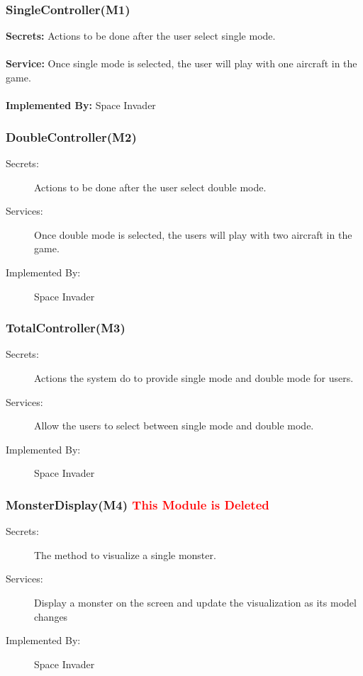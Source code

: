 \documentclass[12pt]{article}
\begin{document}
\subsubsection{SingleController(M1)}

\textbf{Secrets:} Actions to be done after the user select single mode.\\\\
\textbf{Service:} Once single mode is selected, the user will play with one aircraft in the game.\\\\
\textbf{Implemented By:} Space Invader

\subsubsection{DoubleController(M2)}

\begin{description}
\item[Secrets:]Actions to be done after the user select double mode.
\item[Services:]Once double mode is selected, the users will play with two aircraft in the game.
\item[Implemented By:] Space Invader
\end{description}

\subsubsection{TotalController(M3)}
\begin{description}
\item[Secrets:] Actions the system do to provide single mode and double mode for users.
\item[Services:] Allow the users to select between single mode and double mode.
\item[Implemented By:] Space Invader
\end{description}

\subsubsection{MonsterDisplay(M4) \textcolor{red}{This Module is Deleted}}
\begin{description}
\item[Secrets:] The method to visualize a single monster.
\item[Services:] Display a monster on the screen and update the visualization as its model changes
\item[Implemented By:] Space Invader
\end{description}
\end{document}
